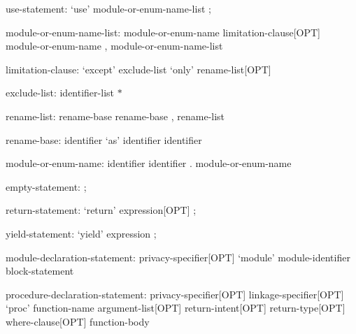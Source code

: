 \begin{syntax}
use-statement:
  `use' module-or-enum-name-list ;
\end{syntax}

\begin{syntax}
module-or-enum-name-list:
  module-or-enum-name limitation-clause[OPT]
  module-or-enum-name , module-or-enum-name-list
\end{syntax}

\begin{syntax}
limitation-clause:
  `except' exclude-list
  `only' rename-list[OPT]
\end{syntax}

\begin{syntax}
exclude-list:
  identifier-list
  $ * $
\end{syntax}

\begin{syntax}
rename-list:
  rename-base
  rename-base , rename-list
\end{syntax}

\begin{syntax}
rename-base:
  identifier `as' identifier
  identifier
\end{syntax}

\begin{syntax}
module-or-enum-name:
  identifier
  identifier . module-or-enum-name
\end{syntax}

\begin{syntax}
empty-statement:
  ;
\end{syntax}

\begin{syntax}
return-statement:
  `return' expression[OPT] ;
\end{syntax}

\begin{syntax}
yield-statement:
  `yield' expression ;
\end{syntax}

\begin{syntax}
module-declaration-statement:
  privacy-specifier[OPT] `module' module-identifier block-statement
\end{syntax}

\begin{syntax}
procedure-declaration-statement:
  privacy-specifier[OPT] linkage-specifier[OPT] `proc' function-name argument-list[OPT] return-intent[OPT] return-type[OPT] where-clause[OPT]
    function-body
\end{syntax}

